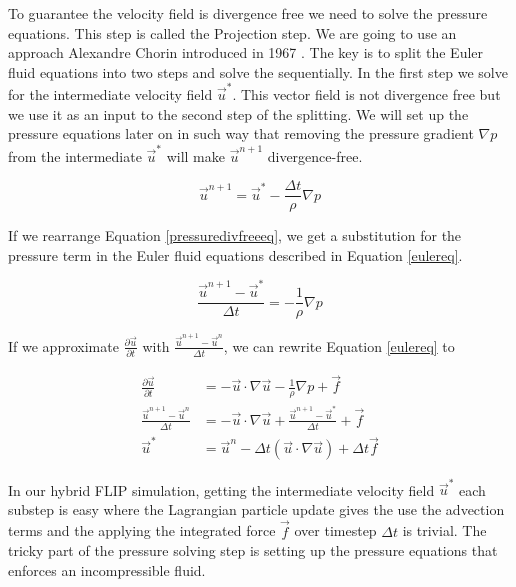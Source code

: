 To guarantee the velocity field is divergence free we need to solve the pressure equations. This step is called the Projection step. We are going to use an approach Alexandre Chorin introduced in 1967 \cite{chorin}. The key is to split the Euler fluid equations into two steps and solve the sequentially. In the first step we solve for the intermediate velocity field $\vec{u}^*$. This vector field is not divergence free but we use it as an input to the second step of the splitting. We will set up the pressure equations later on in such way that removing the pressure gradient $\nabla p$ from the intermediate $\vec{u}^*$ will make $\vec{u}^{n+1}$ divergence-free.

\begin{equation}
\vec{u}^{n+1} = \vec{u}^* - \frac{\Delta t}{\rho} \nabla p
\label{pressuredivfreeeq}
\end{equation}

If we rearrange Equation \ref{pressuredivfreeeq}, we get a substitution for the pressure term in the Euler fluid equations described in Equation \ref{eulereq}.

\begin{equation}
\frac{\vec{u}^{n+1} - \vec{u}^*}{\Delta t}= - \frac{1}{\rho} \nabla p
\label{pressuredivfreeeq}
\end{equation}

If we approximate $\frac{\partial \vec{u}}{\partial t}$ with $\frac{\vec{u}^{n+1} - \vec{u}^{n}}{\Delta t}$, we can rewrite Equation \ref {eulereq} to

\begin{equation}
\begin{split}
\frac{\partial \vec{u}}{\partial t}  &= -\vec{u} \cdot \nabla \vec{u} - \frac{1}{\rho}\nabla p + \vec{f}\\
\frac{\vec{u}^{n+1} - \vec{u}^{n}}{\Delta t}  &= - \vec{u} \cdot \nabla \vec{u} + \frac{\vec{u}^{n+1} - \vec{u}^*}{\Delta t} + \vec{f} \\
\vec{u}^* & = \vec{u}^n - \Delta t(\vec{u} \cdot \nabla \vec{u}) + \Delta t\vec{f}
\end{split}
\end{equation}

In our hybrid FLIP simulation, getting the intermediate velocity field  $\vec{u}^*$ each substep is easy where the Lagrangian particle update gives the use the advection terms and the applying the integrated force $\vec{f}$ over timestep $\Delta t$ is trivial. The tricky part of the pressure solving step is setting up the pressure equations that enforces an incompressible fluid.
